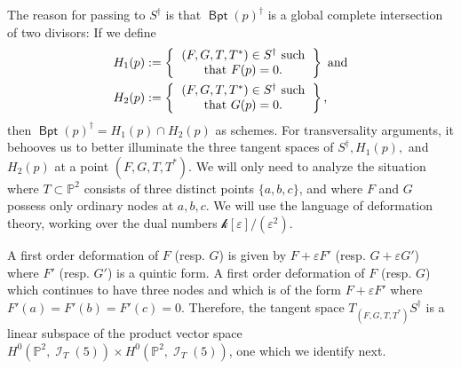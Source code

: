 \documentclass{article}
\renewcommand{\P}{\mathbb{P}}
\renewcommand{\k}{\mathscr{k}}
\DeclareMathOperator{\I}{\mathcal{I}}
\DeclareMathOperator{\BP}{\mathsf{Bpt}}
\begin{document}
The reason for passing to $S^{\dagger}$ is that $\BP(p)^{\dagger}$ is a global complete intersection of two divisors: If we define 
\begin{eqnarray*}
    H_{1}(p) &:= \left\{\begin{tabular}{c}
         $(F,G,T,T^{*}) \in S^{\dagger}$ such\\ that
         $F(p)=0$.\\ 
    \end{tabular} \right\} \text{ and}\\
    H_{2}(p) &:= \left\{\begin{tabular}{c}
         $(F,G,T,T^{*}) \in S^{\dagger}$ such\\ that
         $G(p)=0$.\\ 
    \end{tabular} \right\} \text{,}
\end{eqnarray*}
    then $\BP(p)^{\dagger} = H_{1}(p) \cap H_{2}(p)$ as schemes. 
 For transversality arguments, it behooves us to better illuminate the three tangent spaces of $S^{\dagger}, H_{1}(p),$ and $H_{2}(p)$ at a point $(F,G,T,T^{*})$.  We will only need to analyze the situation where $T \subset \P^{2}$ consists of three distinct points $\{a,b,c\}$, and where $F$ and $G$ possess only ordinary nodes at $a,b,c$.  We will use the language of deformation theory, working over the dual numbers $\k[\varepsilon]/(\varepsilon^{2})$. 
    
    A first order deformation of $F$ (resp. $G$) is given by $F + \varepsilon F'$ (resp. $G + \varepsilon G'$) where $F'$ (resp. $G'$) is a quintic form.  A first order deformation of $F$ (resp. $G$) which continues to have three nodes and which   is of the form $F + \varepsilon F'$ where $F'(a)=F'(b) = F'(c) = 0$. Therefore, the tangent space $T_{(F,G,T,T^{*})}S^{\dagger}$ is a linear subspace of the product vector space $H^{0}\left(\P^{2},\I_{T}(5)\right) \times H^{0}\left(\P^{2},\I_{T}(5)\right)$, one  which we identify next.
\end{document}

